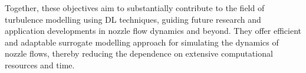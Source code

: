 Together, these objectives aim to substantially contribute to the field of turbulence modelling using DL techniques, guiding future research and application developments in nozzle flow dynamics and beyond. They offer efficient and adaptable surrogate modelling approach for simulating the dynamics of nozzle flows, thereby reducing the dependence on extensive computational resources and time.